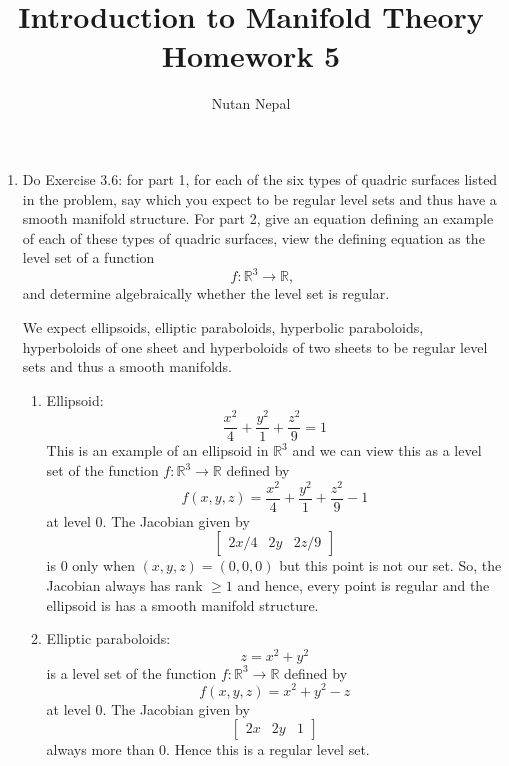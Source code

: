 \documentclass[12pt]{article}
\title{Introduction to Manifold Theory \\
\large Homework 5
}
\author{Nutan Nepal}
\newcommand{\rl}{\mathbb{R}}
\begin{document}
\maketitle
\makebox[\linewidth]{\rule{200mm}{1pt}}
\vspace{1mm}

\begin{enumerate}

\item Do Exercise 3.6: for part 1, for each of
    the six types of quadric surfaces listed in
    the problem, say which you expect to be
    regular level sets and thus have a smooth
    manifold structure. For part 2, give an
    equation defining an example of each of these
    types of quadric surfaces, view the defining
    equation as the level set of a function 
    \[f \colon \rl^3 \to \rl,\]
    and determine algebraically whether the
    level set is regular.

\begin{mybox}

    We expect ellipsoids, elliptic paraboloids,
    hyperbolic paraboloids, hyperboloids of one
    sheet and hyperboloids of two sheets to be
    regular level sets and thus a smooth manifolds.

    \begin{enumerate}
        \item Ellipsoid:
            $$\frac{x^2}{4}+\frac{y^2}{1}+\frac{z^2}{9}
            =1$$
            This is an example of an ellipsoid in
            $\rl^3$ and we can view this as a
            level set of the function
            $f:\rl^3\to\rl$ defined by
            $$f(x,y,z)=
            \frac{x^2}{4}+\frac{y^2}{1}+\frac{z^2}{9}-1$$
            at level 0. The Jacobian given by
            $$\left[\begin{array}{ccc}
                2x/4 &2y &2z/9 
            \end{array}\right]$$
            is 0 only when $(x,y,z)=(0,0,0)$ but
            this point is not our set. So, the Jacobian
            always has rank $\geq 1$ and hence, every point
            is regular and the ellipsoid is has a
            smooth manifold structure.

        \vspace*{3mm}
        \item Elliptic paraboloids:
        $$z=x^2+y^2$$ is a level set of the function
        $f:\rl^3\to\rl$ defined by
        $$f(x,y,z)=
        x^2+y^2-z$$
        at level 0. The Jacobian given by
        $$\left[\begin{array}{ccc}
            2x &2y &1
        \end{array}\right]$$
        always more than 0. Hence this is a regular level
        set.


\end{enumerate}
\end{mybox}
\end{enumerate}
\end{document}
